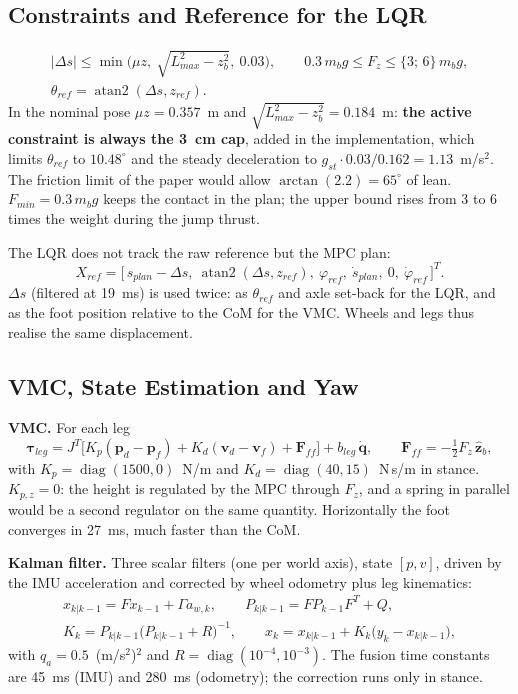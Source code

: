 \documentclass[11pt,a4paper]{article}
\newcommand{\bdq}{\dot{\bm{q}}}
\newcommand{\btau}{\bm{\tau}}
\newcommand{\dgr}{^{\circ}}
\begin{document}
\subsection{Constraints and Reference for the LQR}

\begin{gather}
    |\Delta s| \le \min\!\Big(\mu z,\ \sqrt{L_{max}^2-z_b^2},\ 0.03\Big),\qquad
    0.3\,m_b g \le F_z \le \{3;\,6\}\,m_b g,\\
    \theta_{ref}=\operatorname{atan2}(\Delta s, z_{ref}).
\end{gather}
In the nominal pose $\mu z = 0.357$~m and $\sqrt{L_{max}^2 - z_b^2} = 0.184$~m: \textbf{the active
constraint is always the 3~cm cap}, added in the implementation, which limits $\theta_{ref}$ to
$10.48\dgr$ and the steady deceleration to $g_{st}\cdot 0.03/0.162 = 1.13$~m/s$^2$.  The friction
limit of the paper would allow $\arctan(2.2) = 65\dgr$ of lean.  $F_{min} = 0.3\,m_bg$ keeps the
contact in the plan; the upper bound rises from 3 to 6 times the weight during the jump thrust.

The LQR does not track the raw reference but the MPC plan:
\begin{equation}
    X_{ref}=\big[\,s_{plan}-\Delta s,\ \operatorname{atan2}(\Delta s,z_{ref}),\ \varphi_{ref},\ \dot s_{plan},\ 0,\ \dot\varphi_{ref}\,\big]^{T}.
\end{equation}
$\Delta s$ (filtered at 19~ms) is used twice: as $\theta_{ref}$ and axle set-back for the LQR, and
as the foot position relative to the CoM for the VMC.  Wheels and legs thus realise the same
displacement.

\subsection{VMC, State Estimation and Yaw}

\textbf{VMC.}  For each leg
\begin{equation}
    \btau_{leg} = J^{T}\big[K_p(\bm p_d-\bm p_f) + K_d(\bm v_d-\bm v_f) + \bm F_{ff}\big] + b_{leg}\,\bdq,\qquad
    \bm F_{ff}=-\tfrac12F_z\,\hat{\bm z}_b,
\end{equation}
with $K_p = \operatorname{diag}(1500, 0)$~N/m and $K_d = \operatorname{diag}(40, 15)$~N\,s/m in
stance.  $K_{p,z} = 0$: the height is regulated by the MPC through $F_z$, and a spring in parallel
would be a second regulator on the same quantity.  Horizontally the foot converges in 27~ms, much
faster than the CoM.

\textbf{Kalman filter.}  Three scalar filters (one per world axis), state $[p, v]$, driven by the
IMU acceleration and corrected by wheel odometry plus leg kinematics:
\begin{gather}
    x_{k|k-1} = F x_{k-1} + \Gamma a_{w,k},\qquad P_{k|k-1} = FP_{k-1}F^{T}+Q,\\
    K_k = P_{k|k-1}\big(P_{k|k-1}+R\big)^{-1},\qquad x_{k} = x_{k|k-1}+K_k\big(y_k-x_{k|k-1}\big),
\end{gather}
with $q_a = 0.5$~(m/s$^2$)$^2$ and $R = \operatorname{diag}(10^{-4}, 10^{-3})$.  The fusion time
constants are 45~ms (IMU) and 280~ms (odometry); the correction runs only in stance.
\end{document}
